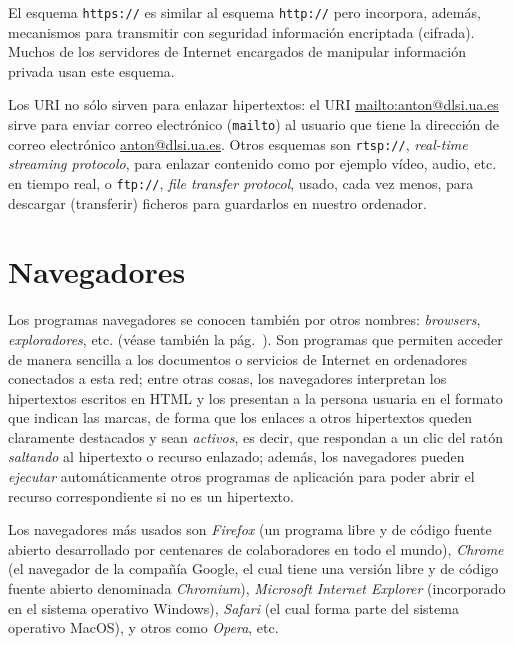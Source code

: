 El esquema {\tt https://} es similar al esquema {\tt http://} pero incorpora, además, mecanismos para transmitir con seguridad información encriptada (cifrada). Muchos de los servidores de Internet encargados de manipular información privada usan este esquema. 

Los URI no sólo sirven para enlazar hipertextos: el URI \url{mailto:anton@dlsi.ua.es} sirve para enviar correo electrónico (\texttt{mailto}) al usuario que tiene la dirección de correo electrónico \url{anton@dlsi.ua.es}. Otros esquemas son \texttt{rtsp://}, \emph{real-time streaming protocolo}, para enlazar contenido como por ejemplo vídeo, audio, etc. en tiempo real, o {\tt ftp://}, \emph{file transfer protocol}, usado, cada vez menos, para descargar (transferir) ficheros para guardarlos en nuestro ordenador\label{pg:ftp}. 

\section{Navegadores} \label{ss:navegadors} Los programas navegadores se conocen también por otros nombres: \emph{browsers}, \emph{exploradores}, etc. (véase también la pág.~\pageref{pg:navegadors}). Son programas que permiten acceder de manera sencilla a los documentos o servicios de Internet en ordenadores conectados a esta red; entre otras cosas, los navegadores interpretan los hipertextos escritos en HTML y los presentan a la persona usuaria en el formato que indican las marcas, de forma que los enlaces a otros hipertextos queden claramente destacados y sean \emph{activos}, es decir, que respondan a un clic del ratón \emph{saltando} al hipertexto o recurso enlazado; además, los navegadores pueden \emph{ejecutar} automáticamente otros programas de aplicación para poder abrir el recurso correspondiente si no es un hipertexto. 

Los navegadores más usados son \emph{Firefox} (un programa libre y de código fuente abierto desarrollado por centenares de colaboradores en todo el mundo), \emph{Chrome} (el navegador de la compañía Google, el cual tiene una versión libre y de código fuente abierto denominada \emph{Chromium}), \emph{Microsoft Internet Explorer} (incorporado en el sistema operativo Windows), \emph{Safari} (el cual forma parte del sistema operativo MacOS), y otros como \emph{Opera}, etc. 


